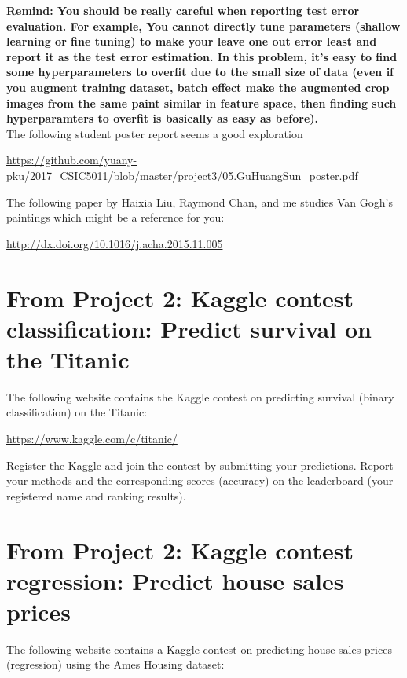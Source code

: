 \documentclass[11pt]{article}
\begin{document}
\textbf{Remind: You should be really careful when reporting test error evaluation. For example, You cannot directly tune parameters (shallow learning or fine tuning) to make your leave one out error least and report it as the test error estimation. In this problem, it's easy to find some hyperparameters to overfit due to the small size of data (even if you augment training dataset, batch effect make the augmented crop images from the same paint similar in feature space, then finding such hyperparamters to overfit is basically as easy as before).}\\

The following student poster report seems a good exploration

\url{https://github.com/yuany-pku/2017_CSIC5011/blob/master/project3/05.GuHuangSun_poster.pdf}

The following paper by Haixia Liu, Raymond Chan, and me studies Van Gogh's paintings which might be a reference for you:

\url{http://dx.doi.org/10.1016/j.acha.2015.11.005}

%
%
%
%
\section{From Project 2: Kaggle contest classification: Predict survival on the Titanic}
The following website contains the Kaggle contest on predicting survival (binary classification) on the Titanic: 

\url{https://www.kaggle.com/c/titanic/}

\noindent Register the Kaggle and join the contest by submitting your predictions. Report your methods and the corresponding scores (accuracy) on the leaderboard (your registered name and ranking results). 

\section{From Project 2: Kaggle contest regression: Predict house sales prices}
The following website contains a Kaggle contest on predicting house sales prices (regression) using the Ames Housing dataset: 
\end{document}
